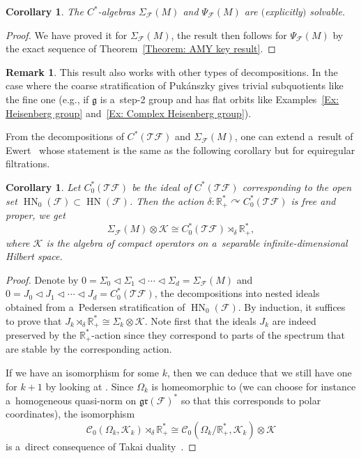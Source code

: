 \documentclass[pdftex]{sigma}
\newcommand{\R}{\mathbb R} %
\newcommand{\CCC}{\mathscr{C}} %
\newcommand{\F}{\mathcal{F}} %
\newcommand{\g}{\mathfrak{g}} %
\newcommand{\act}{\curvearrowright} %
\newcommand{\T}{\mathcal{T}} %
\newcommand{\HN}{\operatorname{HN}} %
\newcommand{\Fb}{\mathcal{F}} %
\newcommand{\gr}{\mathfrak{gr}} %
\numberwithin{equation}{section}
\newtheorem{cor}[thm]{Corollary}
\theoremstyle{definition}
\newtheorem{rem}[thm]{Remark}
\begin{document}
\begin{cor}
 The $C^*$-algebras $\Sigma_{\Fb}(M)$ and $\Psi_{\Fb}(M)$ are $($explicitly$)$ solvable.
\end{cor}

\begin{proof}
 We have proved it for $\Sigma_{\Fb}(M)$, the result then follows for $\Psi_{\Fb}(M)$ by the exact sequence of Theorem~\ref{Theorem: AMY key result}.
\end{proof}

\begin{rem}
 This result also works with other types of decompositions. In the case where the coarse stratification of Puk\'anszky gives trivial subquotients like the fine one (e.g., if $\g$ is a~step-2 group and has flat orbits like Examples~\ref{Ex: Heisenberg group} and~\ref{Ex: Complex Heisenberg group}).
\end{rem}

From the decompositions of $C^*(\T\F)$ and $\Sigma_{\F}(M)$, one can extend a~result of Ewert~\cite{Ewert} whose statement is the same as the following corollary but for equiregular filtrations.

\begin{cor}
 Let $C^*_0(\T\F)$ be the ideal of $C^*(\T\F)$ corresponding to the open set $\HN_0(\F)\subset \HN(\F)$. Then the action $\delta\colon \R^*_+\act C^*_0(\T\F)$ is free and proper, we get
 \[
 \Sigma_{\F}(M)\otimes \mathcal{K} \cong C^*_0(\T\F)\rtimes_{\delta}\R^*_+,
 \]
 where $\mathcal{K}$ is the algebra of compact operators on a~separable infinite-dimensional Hilbert space.
\end{cor}

\begin{proof}
 Denote by $0 =\Sigma_0 \triangleleft\Sigma_1\triangleleft\cdots\triangleleft \Sigma_d = \Sigma_{\F}(M)$
 and $0 =J_0 \triangleleft J_1\triangleleft\cdots\triangleleft J_d = C^*_0(\T\F)$,
 the decompositions into nested ideals obtained from a~Pedersen stratification of $\HN_0(\F)$. By induction, it suffices to prove that $J_k \rtimes_{\delta}\R^*_+ \cong \Sigma_k\otimes \mathcal{K}$. Note first that the ideals $J_k$ are indeed preserved by the $\R^*_+$-action since they correspond to parts of the spectrum that are stable by the corresponding action.

 If we have an isomorphism for some $k$, then we can deduce that we still have one for ${k+1}$ by looking at . Since $\Omega_k$ is homeomorphic to \smash{${\Omega_k}/{\R^*_+}\times \R^*_+$} (we can choose for instance a~homogeneous quasi-norm on $\gr(\Fb)^*$ so that this corresponds to polar coordinates), the isomorphism
 \[\CCC_0(\Omega_k,\mathcal{K}_k)\rtimes_{\delta}\R^*_+ \cong \CCC_0({\Omega_k}/{\R^*_+},\mathcal{K}_k)\otimes \mathcal{K}\]
 is a~direct consequence of Takai duality~\cite{Takai}.
\end{proof}
\end{document}

